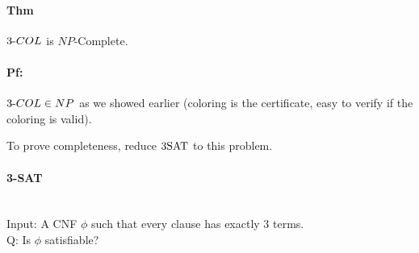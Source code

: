 \documentclass[12 pt]{article}
\begin{document}
          \paragraph{Thm} $3\hbox{-}COL$ is $NP$-Complete.
          \paragraph{Pf:} $3\hbox{-}COL \in NP$ as we showed earlier
          (coloring is the certificate, easy to verify if the coloring
          is valid).

          To prove completeness, reduce $3\hbox{SAT}$ to this problem.
          \paragraph{3-SAT}~
          \\ Input: A CNF $\phi$ such that every clause has exactly
          $3$ terms.
          \\ Q: Is $\phi$ satisfiable?
\end{document}
